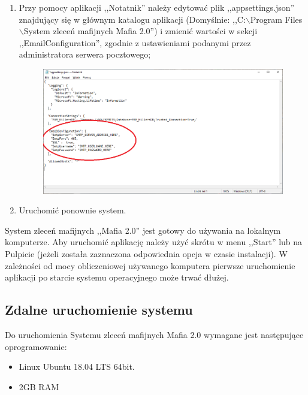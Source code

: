 \documentclass[12pt,a4paper]{article}
\begin{document}
\begin{enumerate}
\begin{figure}[H]
					\end{figure}				
				\item Przy pomocy aplikacji ,,Notatnik'' należy edytować plik ,,appsettings.json'' znajdujący się w głównym katalogu aplikacji (Domyślnie:
						,,C:$\backslash$Program Files$\backslash$System zleceń mafijnych Mafia 2.0'') i zmienić wartości w sekcji ,,EmailConfiguration'', zgodnie z ustawieniami podanymi 									przez administratora serwera pocztowego;\\
					\begin{figure}[H]
						\includegraphics[scale=0.5]{img/Local_Install_13.png}
						\centering
					\end{figure}				
				\item Uruchomić ponownie system.
			\end{enumerate}
			System zleceń mafijnych ,,Mafia 2.0'' jest gotowy do używania na lokalnym komputerze. Aby uruchomić aplikację należy użyć skrótu w menu ,,Start'' lub na Pulpicie (jeżeli została 						zaznaczona odpowiednia opcja w czasie instalacji). W zależności od mocy obliczeniowej używanego komputera pierwsze uruchomienie aplikacji po starcie systemu operacyjnego
				może trwać dłużej.		
		\subsection{Zdalne uruchomienie systemu}
			Do uruchomienia Systemu zleceń mafijnych Mafia 2.0 wymagane jest następujące oprogramowanie:
			\begin{itemize}
				\item Linux Ubuntu 18.04 LTS 64bit.
				\item 2GB RAM
			\end{itemize}
			
\end{document}
